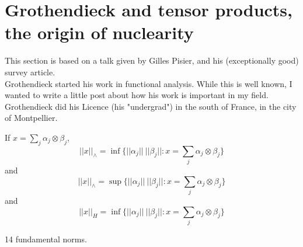 \section{Grothendieck and tensor products, the origin of nuclearity}

This section is based on a talk given by Gilles Pisier, and his (exceptionally good) survey article.\\

Grothendieck started his work in functional analysis. While this is well known, I wanted to write a little post about how his work is important in my field. \\

Grothendieck did his Licence (his "undergrad") in the south of France, in the city of Montpellier. 

If $x= \sum_j \alpha_j \otimes \beta_j$,
\[|| x ||_\wedge  = \inf \{ || \alpha_j || \ || \beta_j || : x=\sum_j \alpha_j \otimes \beta_j\}\]
and
\[|| x ||_\wedge  = \sup \{ || \alpha_j || \ || \beta_j || : x=\sum_j \alpha_j \otimes \beta_j\}\]
and
\[|| x ||_H  = \inf \{ || \alpha_j || \ || \beta_j || : x=\sum_j \alpha_j \otimes \beta_j\}\]

14 fundamental norms.